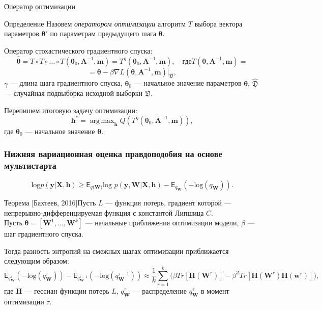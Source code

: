 \documentclass[usenames,dvipsnames,11pt,pdf,utf8,russian,aspectratio=43]{beamer}
\DeclareMathOperator*{\argmax}{arg\,max}
\begin{document}
\begin{frame}{Оператор оптимизации}
\small
\begin{block}{Определение}
Назовем \textit{оператором оптимизации} алгоритм $T$ выбора вектора параметров $\boldsymbol{\theta}'$  по параметрам предыдущего шага $\boldsymbol{\theta}$.
\end{block}
Оператор стохастического градиентного спуска:
\[
	 \hat{\boldsymbol{\theta}} = T \circ T \circ \dots \circ T(\boldsymbol{\theta}_0, \mathbf{A}^{-1}, \mathbf{m}) = T^\eta(\boldsymbol{\theta}_0, \mathbf{A}^{-1}, \mathbf{m}), \quad\text{где}	T(\boldsymbol{\theta}, \mathbf{A}^{-1}, \mathbf{m}) =
\]
\[=\boldsymbol{\theta} - \beta \nabla L(\boldsymbol{\theta}, \mathbf{A}^{-1}, \mathbf{m})|_{\hat{\mathfrak{D}}}, 
\]
$\gamma$ --- длина шага градиентного спуска, $\boldsymbol{\theta}_0$ --- начальное значение параметров $\boldsymbol{\theta}$, $\hat{\mathfrak{D}}$ --- случайная подвыборка исходной выборки $\mathfrak{D}$.


Перепишем итоговую задачу оптимизации:
\[
	{\mathbf{h}}^{*} = \argmax_{\mathbf{h}} Q\left( T^\eta(\boldsymbol{\theta}_0, \mathbf{A}^{-1}, \mathbf{m})\right),
\]
где $\boldsymbol{\theta}_0$ --- начальное значение $\boldsymbol{\theta}$.



\end{frame}




\begin{frame}
\small
\frametitle{Нижняя вариационная оценка правдоподобия на основе мультистарта}
$$\text{log}p(\mathbf{y}|\mathbf{X}, \mathbf{h}) \geq \mathsf{E}_{q(\mathbf{W)}}\text{log~}p (\mathbf{y}, \mathbf{W}|\mathbf{X}, \mathbf{h}) - \mathsf{E}_{q_{\mathbf{W}}}(-\text{log}(q_\mathbf{W})).$$

\begin{block}{Теорема [Бахтеев, 2016]}Пусть $L$ --- функция потерь, градиент которой ---  непрерывно-дифференцируемая функция с константой Липшица $C$. \\
Пусть $\boldsymbol{\theta} = [\mathbf{W}^1,\dots,\mathbf{W}^k]$ ---  начальные приближения оптимизации модели, $\beta$ --- шаг градиентного спуска.

Тогда разность энтропий на смежных шагах оптимизации приближается следующим образом:
\small
\[
	\mathsf{E}_{q^{\tau}_{\mathbf{W}}}(-\text{log}(q^{\tau}_\mathbf{W})) -  \mathsf{E}_{q^{\tau-1}_{\mathbf{W}}}(-\text{log}(q^{\tau-1}_\mathbf{W}))  \approx  \frac{1}{k}\sum_{r=1}^k \bigl(\beta Tr[\mathbf{H}(\mathbf{W}^r)] - \beta^2 Tr[\mathbf{H}(\mathbf{W}^r)\mathbf{H}(\mathbf{w}^r)]  \bigr),
\]
где $\mathbf{H}$ --- гессиан функции потерь $L$, $q^{\tau}_\mathbf{W}$ --- распределение $q^{\tau}_\mathbf{W}$ в момент оптимизации $\tau$.
\end{block}
\end{frame}
\end{document}
